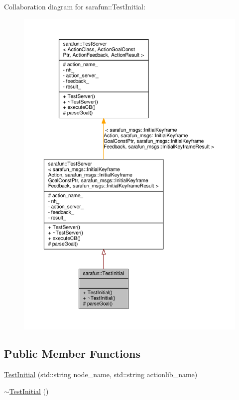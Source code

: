 Collaboration diagram for sarafun\-:\-:Test\-Initial\-:
\nopagebreak
\begin{figure}[H]
\begin{center}
\leavevmode
\includegraphics[width=350pt]{d8/d5d/classsarafun_1_1TestInitial__coll__graph}
\end{center}
\end{figure}
\subsection*{Public Member Functions}
\begin{DoxyCompactItemize}
\item 
\hyperlink{classsarafun_1_1TestInitial_a823bdc6188c1f3cdf7546b2ed9ea7ea7_a823bdc6188c1f3cdf7546b2ed9ea7ea7}{Test\-Initial} (std\-::string node\-\_\-name, std\-::string actionlib\-\_\-name)
\item 
\hyperlink{classsarafun_1_1TestInitial_af9c5ec764aeb3f64c640714844dc23c4_af9c5ec764aeb3f64c640714844dc23c4}{$\sim$\-Test\-Initial} ()
\end{DoxyCompactItemize}

